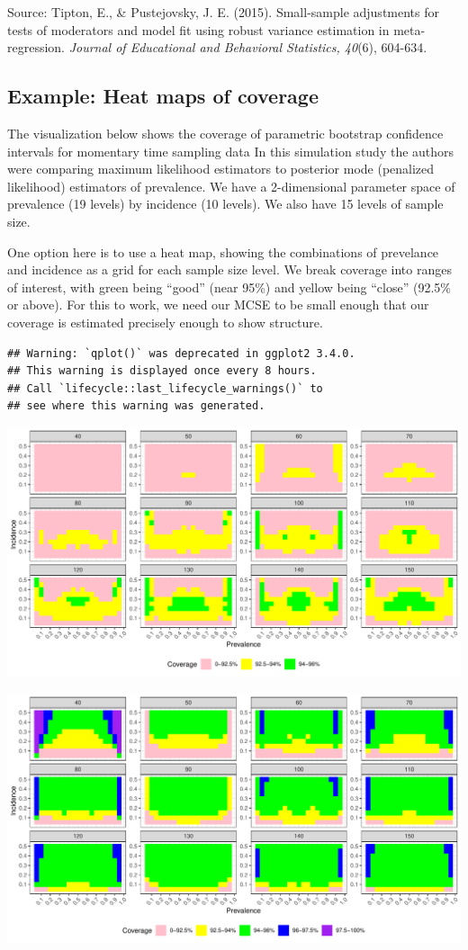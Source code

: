 \documentclass[
]{book}
\begin{document}
Source: Tipton, E., \& Pustejovsky, J. E. (2015). Small-sample adjustments for tests of moderators and model fit using robust variance estimation in meta-regression. \emph{Journal of Educational and Behavioral Statistics, 40}(6), 604-634.

\subsection{Example: Heat maps of coverage}\label{example-heat-maps-of-coverage}

The visualization below shows the coverage of parametric bootstrap confidence intervals for momentary time sampling data
In this simulation study the authors were comparing maximum likelihood estimators to posterior mode (penalized likelihood) estimators of prevalence.
We have a 2-dimensional parameter space of prevalence (19 levels) by incidence (10 levels).
We also have 15 levels of sample size.

One option here is to use a heat map, showing the combinations of prevelance and incidence as a grid for each sample size level.
We break coverage into ranges of interest, with green being ``good'' (near 95\%) and yellow being ``close'' (92.5\% or above).
For this to work, we need our MCSE to be small enough that our coverage is estimated precisely enough to show structure.

\begin{verbatim}
## Warning: `qplot()` was deprecated in ggplot2 3.4.0.
## This warning is displayed once every 8 hours.
## Call `lifecycle::last_lifecycle_warnings()` to
## see where this warning was generated.
\end{verbatim}

\begin{center}\includegraphics[width=0.75\linewidth]{Designing-Simulations-in-R_files/figure-latex/swan_example_setup-1} \end{center}

\begin{center}\includegraphics[width=0.75\linewidth]{Designing-Simulations-in-R_files/figure-latex/unnamed-chunk-196-1} \end{center}
\end{document}
